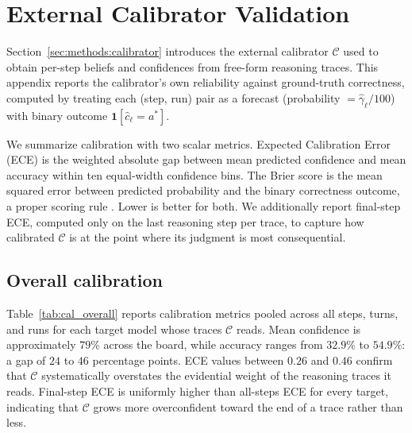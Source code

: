 \clearpage
\appendix

\section{External Calibrator Validation}
\label{app:calibration}

Section~\ref{sec:methods:calibrator} introduces the external calibrator
$\mathcal{C}$ used to obtain per-step beliefs and confidences from
free-form reasoning traces. This appendix reports the calibrator's
own reliability against ground-truth correctness, computed by treating
each (step, run) pair as a forecast (probability $= \hat{\gamma}_\ell / 100$)
with binary outcome $\mathbf{1}[\hat{c}_\ell = a^*]$.

We summarize calibration with two scalar metrics. Expected Calibration
Error (ECE) is the weighted absolute gap between mean predicted
confidence and mean accuracy within ten equal-width confidence bins.
The Brier score is the mean squared error between predicted probability
and the binary correctness outcome, a proper scoring rule
\citep{li2025conftuner}. Lower is better for both. We additionally
report final-step ECE, computed only on the last reasoning step per
trace, to capture how calibrated $\mathcal{C}$ is at the point where
its judgment is most consequential.

\subsection{Overall calibration}

Table~\ref{tab:cal_overall} reports calibration metrics pooled across
all steps, turns, and runs for each target model whose traces
$\mathcal{C}$ reads. Mean confidence is approximately $79\%$ across
the board, while accuracy ranges from $32.9\%$ to $54.9\%$: a gap of
$24$ to $46$ percentage points. ECE values between $0.26$ and $0.46$
confirm that $\mathcal{C}$ systematically overstates the evidential
weight of the reasoning traces it reads. Final-step ECE is uniformly
higher than all-steps ECE for every target, indicating that
$\mathcal{C}$ grows more overconfident toward the end of a trace
rather than less.


